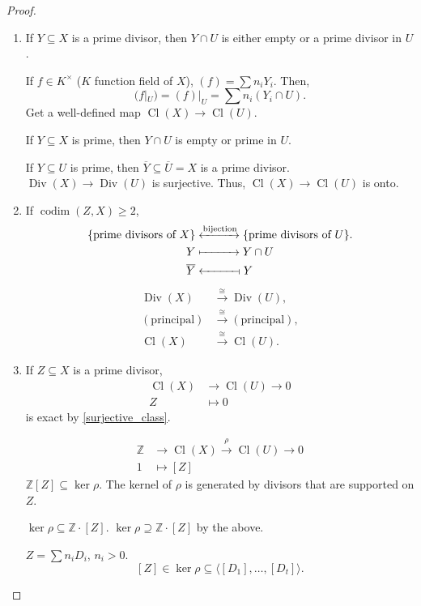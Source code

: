 \documentclass[12pt]{article}
\DeclareMathOperator{\codim}{codim}
\DeclareMathOperator{\Div}{Div}
\DeclareMathOperator{\Cl}{Cl}
\theoremstyle{definition}
\begin{document}
\begin{proof}
\begin{enumerate}[label=\arabic*)]
\item If $Y\subseteq X$ is a prime divisor, then $Y\cap U$ is either empty or a prime divisor in $U$.

If $f\in K^\times$ ($K$ function field of $X$), $(f)=\sum n_iY_i$. Then,
\[(f|_U)=(f)|_U=\sum n_i(Y_i\cap U).\]
Get a well-defined map $\Cl(X)\rightarrow\Cl(U)$.

If $Y\subseteq X$ is prime, then $Y\cap U$ is empty or prime in $U$.

If $Y\subseteq U$ is prime, then $\overline Y\subseteq\overline U=X$ is a prime divisor. $\Div(X)\rightarrow\Div(U)$ is surjective. Thus, $\Cl(X)\rightarrow\Cl(U)$ is onto.

\item If $\codim(Z,X)\geq2$,
\begin{align*}
\{\text{prime divisors of }X\}&\xleftrightarrow{\text{bijection}}\{\text{prime divisors of }U\}.\\Y&\xmapsto{\hphantom{\text{bijection}}}Y\cap U\\\overline Y&\xleftarrow{\hphantom{\text{bijection}}}\!\shortmid Y
\end{align*}
\begin{align*}
\Div(X)&\overset\cong\longrightarrow\Div(U),\\(\text{principal})&\overset\cong\longrightarrow(\text{principal}),\\\Cl(X)&\overset\cong\longrightarrow\Cl(U).
\end{align*}

\item If $Z\subseteq X$ is a prime divisor,
\begin{align*}
\Cl(X)&\longrightarrow\Cl(U)\longrightarrow0\\Z&\longmapsto0
\end{align*}
is exact by \ref{surjective_class}.

\begin{align*}
\mathbb Z&\longrightarrow\Cl(X)\overset\rho\longrightarrow\Cl(U)\longrightarrow0\\1&\longmapsto[Z]
\end{align*}
$\mathbb Z[Z]\subseteq\ker\rho$. The kernel of $\rho$ is generated by divisors that are supported on $Z$.

$\ker\rho\subseteq\mathbb Z\cdot[Z]$. $\ker\rho\supseteq\mathbb Z\cdot[Z]$ by the above.

$Z=\sum n_iD_i$, $n_i>0$.
\[[Z]\in\ker\rho\subseteq\langle[D_1],\ldots,[D_t]\rangle.\]
\end{enumerate}
\end{proof}
\end{document}
